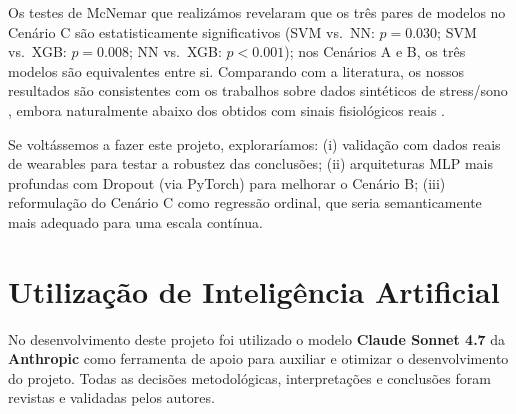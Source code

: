 \documentclass[12pt,a4paper]{article}
\begin{document}
Os testes de McNemar que realizámos revelaram que os três pares de modelos no Cenário C
são estatisticamente significativos (SVM vs.\ NN: $p = 0.030$; SVM vs.\ XGB: $p = 0.008$;
NN vs.\ XGB: $p < 0.001$); nos Cenários A e B, os três modelos são equivalentes entre si. Comparando com a literatura, os nossos resultados
são consistentes com os trabalhos sobre dados sintéticos de stress/sono \cite{lei2024},
embora naturalmente abaixo dos obtidos com sinais fisiológicos reais \cite{acosta2025}.

Se voltássemos a fazer este projeto, exploraríamos: (i) validação com dados reais de
wearables para testar a robustez das conclusões; (ii) arquiteturas MLP mais profundas
com Dropout (via PyTorch) para melhorar o Cenário B; (iii) reformulação do Cenário C
como regressão ordinal, que seria semanticamente mais adequado para uma escala contínua.

\section*{Utilização de Inteligência Artificial}

No desenvolvimento deste projeto foi utilizado o modelo \textbf{Claude Sonnet 4.7}
da \textbf{Anthropic} como ferramenta de apoio para auxiliar e otimizar o desenvolvimento do projeto. Todas as decisões
metodológicas, interpretações e conclusões foram revistas e validadas pelos autores.
\end{document}
